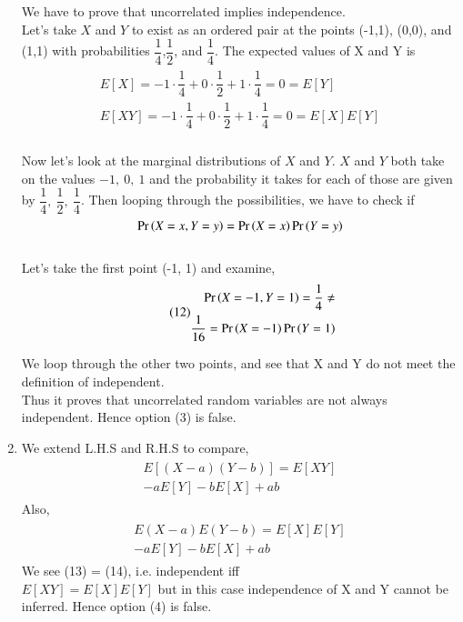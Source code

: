 \documentclass[journal,12pt,twocolumn]{IEEEtran}
\begin{document}
\begin{enumerate}
We have to prove that uncorrelated implies independence.\\
Let’s take $X$ and $Y$ to exist as an ordered pair at the points (-1,1), (0,0), and (1,1) with probabilities $\dfrac{1}{4}$,$\dfrac{1}{2}$, and $\dfrac{1}{4}$. The expected values of X and Y is\\
\begin{align}\tag{11}
    \begin{split}
        E[X] = -1\cdot\dfrac{1}{4} + 0\cdot\dfrac{1}{2} + 1\cdot\dfrac{1}{4} = 0 = E[Y]\\
        E[XY] = -1\cdot\dfrac{1}{4} + 0\cdot\dfrac{1}{2} + 1\cdot\dfrac{1}{4} = 0 = E[X]E[Y]
    \end{split}
\end{align}\\

Now let's look at the marginal distributions of $X$ and $Y$. $X$ and $Y$ both take on the values $-1,\ 0,\ 1$ and the probability it takes for each of those are given by $\dfrac{1}{4},\ \dfrac{1}{2},\ \dfrac{1}{4}$. Then looping through the possibilities, we have to check if $$\Pr\left(X=x, Y=y\right) = \Pr\left(X=x\right)\Pr\left(Y=y\right)$$\\
Let's take the first point (-1, 1) and examine,\\
\begin{align}\tag{12}
    \begin{split}
        \Pr\left(X=-1, Y=1\right) = \dfrac{1}{4} \ne\\ \dfrac{1}{16} = \Pr\left(X=-1\right)\Pr\left(Y=1\right)
    \end{split}
\end{align}

We loop through the other two points, and see that X and Y do not meet the definition of independent.\\
Thus it proves that uncorrelated random variables are not always independent. Hence option (3) is false.\\
    \item We extend L.H.S and R.H.S to compare,
\begin{align}\tag{13}
    \begin{split}
        E[(X-a)(Y-b)] = E[XY]\\ - aE[Y] - bE[X] + ab
    \end{split}
\end{align}
Also,
\begin{align}\tag{14}
    \begin{split}
        E(X-a) E(Y-b) = E[X]E[Y]\\ - aE[Y] - bE[X] + ab
    \end{split}
\end{align}
We see (13) = (14), i.e. independent iff\\
$E[XY] = E[X] E[Y]$ but in this case independence of X and Y cannot be inferred. Hence option (4) is false.
\end{enumerate}
\end{document}
